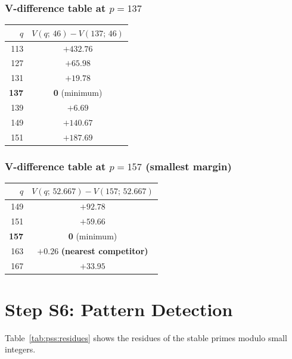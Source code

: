 \documentclass[12pt,a4paper]{article}
\theoremstyle{definition}
\theoremstyle{remark}
\begin{document}
\subsubsection*{V-difference table at $p = 137$}

\begin{center}
\begin{tabular}{rc}
\toprule
$q$ & $V(q;\,46) - V(137;\,46)$ \\
\midrule
113 & $+432.76$ \\
127 & $+65.98$ \\
131 & $+19.78$ \\
\textbf{137} & \textbf{0} (minimum) \\
139 & $+6.69$ \\
149 & $+140.67$ \\
151 & $+187.69$ \\
\bottomrule
\end{tabular}
\end{center}

\subsubsection*{V-difference table at $p = 157$ (smallest margin)}

\begin{center}
\begin{tabular}{rc}
\toprule
$q$ & $V(q;\,52.667) - V(157;\,52.667)$ \\
\midrule
149 & $+92.78$ \\
151 & $+59.66$ \\
\textbf{157} & \textbf{0} (minimum) \\
163 & $+0.26$ \quad \textbf{(nearest competitor)} \\
167 & $+33.95$ \\
\bottomrule
\end{tabular}
\end{center}

\section{Step S6: Pattern Detection}
\label{sec:pss:s6}

Table~\ref{tab:pss:residues} shows the residues of the stable primes modulo
small integers.
\end{document}
